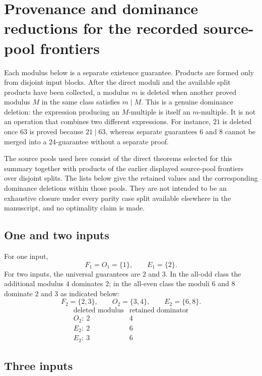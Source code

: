 \section{Provenance and dominance reductions for the recorded source-pool frontiers}\label{app:frontiers}

Each modulus below is a separate existence guarantee.  Products are formed
only from disjoint input blocks.  After the direct moduli and the available
split products have been collected, a modulus $m$ is deleted when another
proved modulus $M$ in the same class satisfies $m\mid M$.  This is a genuine
dominance deletion: the expression producing an $M$-multiple is itself an
$m$-multiple.  It is not an operation that combines two different
expressions.  For instance, $21$ is deleted once $63$ is proved because
$21\mid63$, whereas separate guarantees $6$ and $8$ cannot be merged into a
$24$-guarantee without a separate proof.

The source pools used here consist of the direct theorems selected for this
summary together with products of the earlier displayed source-pool frontiers
over disjoint splits.  The lists below give the retained values and the
corresponding dominance deletions within those pools.  They are not intended
to be an exhaustive closure under every parity case split available elsewhere
in the manuscript, and no optimality claim is made.

\subsection{One and two inputs}

For one input,
\[
 F_1=O_1=\{1\},\qquad E_1=\{2\}.
\]
For two inputs, the universal guarantees are $2$ and $3$.  In the all-odd
class the additional modulus $4$ dominates $2$; in the all-even class the
moduli $6$ and $8$ dominate $2$ and $3$ as indicated below:
\[
 F_2=\{2,3\},\qquad O_2=\{3,4\},\qquad E_2=\{6,8\}.
\]
\[
\begin{array}{c|c}
\text{deleted modulus} & \text{retained dominator}\\ \hline
O_2:\ 2 & 4\\
E_2:\ 2 & 6\\
E_2:\ 3 & 6
\end{array}
\]

\subsection{Three inputs}

